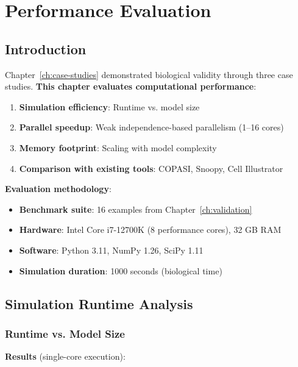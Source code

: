 \chapter{Performance Evaluation}
\label{ch:performance}

\section{Introduction}
\label{sec:performance-intro}

Chapter~\ref{ch:case-studies} demonstrated biological validity through three case studies. \textbf{This chapter evaluates computational performance}:

\begin{enumerate}
    \item \textbf{Simulation efficiency}: Runtime vs. model size
    \item \textbf{Parallel speedup}: Weak independence-based parallelism (1--16 cores)
    \item \textbf{Memory footprint}: Scaling with model complexity
    \item \textbf{Comparison with existing tools}: COPASI, Snoopy, Cell Illustrator
\end{enumerate}

\textbf{Evaluation methodology}:

\begin{itemize}
    \item \textbf{Benchmark suite}: 16 examples from Chapter~\ref{ch:validation}
    \item \textbf{Hardware}: Intel Core i7-12700K (8 performance cores), 32 GB RAM
    \item \textbf{Software}: Python 3.11, NumPy 1.26, SciPy 1.11
    \item \textbf{Simulation duration}: 1000 seconds (biological time)
\end{itemize}

\section{Simulation Runtime Analysis}
\label{sec:runtime-analysis}

\subsection{Runtime vs. Model Size}
\label{subsec:runtime-vs-size}

\textbf{Results} (single-core execution):

